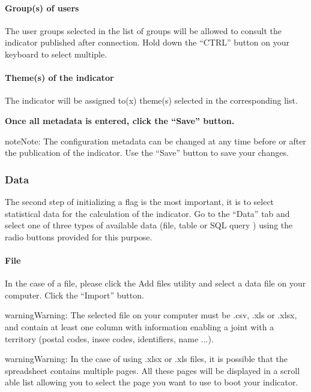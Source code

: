\documentclass[letterpaper,10pt,english]{sphinxmanual}
\begin{document}
\paragraph{Group(s) of users}
\label{indicators/indicatorspanel:groupe-s-d-utilisateurs}
The user groups selected in the list of groups will be allowed to consult the indicator published after connection. Hold down the ``CTRL'' button on your keyboard to select multiple.


\paragraph{Theme(s) of the indicator}
\label{indicators/indicatorspanel:theme-s-de-l-indicateur}
The indicator will be assigned to(x) theme(s) selected in the corresponding list.

\textbf{Once all metadata is entered, click the ``Save'' button.}

\begin{notice}{note}{Note:}
The configuration metadata can be changed at any time before or after the publication of the indicator. Use the ``Save'' button to save your changes.
\end{notice}


\subsubsection{Data}
\label{indicators/indicatorspanel:donnees}
The second step of initializing a flag is the most important, it is to select statistical data for the calculation of the indicator. Go to the ``Data'' tab and select one of three types of available data (file, table or SQL query ) using the radio buttons provided for this purpose.


\paragraph{File}
\label{indicators/indicatorspanel:fichier}
In the case of a file, please click the Add files utility and select a data file on your computer. Click the ``Import'' button.

\begin{notice}{warning}{Warning:}
The selected file on your computer must be .csv, .xls or .xlsx, and contain at least one column with information enabling a joint with a territory (postal codes, insee codes, identifiers, name ...).
\end{notice}

\begin{notice}{warning}{Warning:}
In the case of using .xlsx or .xls files, it is possible that the spreadsheet contains multiple pages. All these pages will be displayed in a scroll able list allowing you to select the page you want to use to boot your indicator.
\end{notice}
\end{document}
